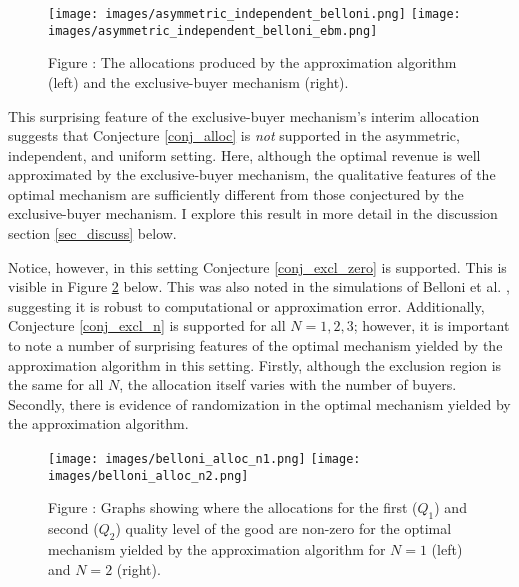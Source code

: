 \begin{figure}[H]
    \begin{center}
    \texttt{[image: images/asymmetric\_independent\_belloni.png]}
    \texttt{[image: images/asymmetric\_independent\_belloni\_ebm.png]}
    \end{center}
    
    \vspace{1mm}
    \raggedright{\small {\sc Figure \thefig\label{fig:belloni_alloc}:} The allocations produced by the approximation algorithm (left) and the exclusive-buyer mechanism (right).} 
\end{figure}

\noindent This surprising feature of the exclusive-buyer mechanism's interim allocation suggests that Conjecture \ref{conj_alloc} is \textit{not} supported in the asymmetric, independent, and uniform setting. Here, although the optimal revenue is well approximated by the exclusive-buyer mechanism, the qualitative features of the optimal mechanism are sufficiently different from those conjectured by the exclusive-buyer mechanism. I explore this result in more detail in the discussion section \ref{sec_discuss} below.

Notice, however, in this setting Conjecture \ref{conj_excl_zero} is supported. This is visible in Figure \ref{fig:belloni_alloc_alln} below. This was also noted in the simulations of Belloni et al. \autocite*{belloni2010multidimensional}, suggesting it is robust to computational or approximation error. Additionally, Conjecture \ref{conj_excl_n} is supported for all $N=1,2,3$; however, it is important to note a number of surprising features of the optimal mechanism yielded by the approximation algorithm in this setting. Firstly, although the exclusion region is the same for all $N$, the allocation itself varies with the number of buyers. Secondly, there is evidence of randomization in the optimal mechanism yielded by the approximation algorithm. 

\begin{figure}[H]
    \begin{center}
    \texttt{[image: images/belloni\_alloc\_n1.png]}
    \texttt{[image: images/belloni\_alloc\_n2.png]}
    \end{center}
    
    \vspace{1mm}
    \raggedright{\small {\sc Figure \thefig\label{fig:belloni_alloc_alln}:} Graphs showing where the allocations for the first ($Q_1$) and second ($Q_2$) quality level of the good are non-zero for the optimal mechanism yielded by the approximation algorithm for $N=1$ (left) and $N=2$ (right).} 
\end{figure}

